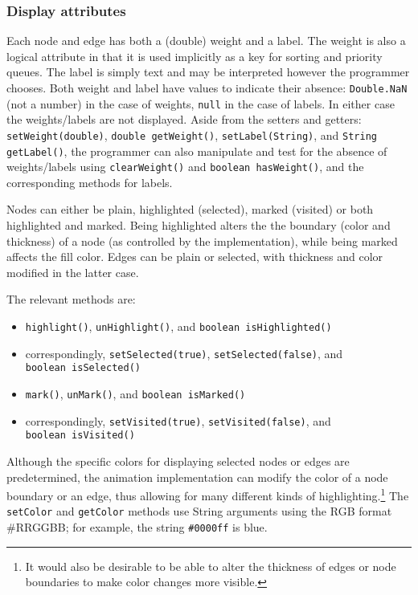 \subsubsection*{Display attributes}

Each node and edge has
both a (double) weight and a label.
The weight
is also a logical
attribute in that
it is used implicitly as a
key for
sorting and priority queues.
The label is simply text and may be interpreted however the programmer
chooses.
Both weight and label have values to indicate their absence:
\texttt{Double.NaN} (not a number) in the case of weights, \texttt{null}
in the case of labels.
In either case the weights/labels are not displayed.
Aside from the setters and getters: \texttt{setWeight(double)},
\mbox{\texttt{double getWeight()}}, \texttt{setLabel(String)},
and \mbox{\texttt{String getLabel()}}, the programmer can also
manipulate and test for the absence of weights/labels using
\texttt{clearWeight()} and \texttt{boolean~hasWeight()},
and the corresponding methods for labels.

Nodes can either be plain, highlighted (selected), marked (visited) or both highlighted and
marked.
Being highlighted alters the
the boundary (color and thickness) of a node (as controlled by the
implementation), while being marked affects the fill color.
Edges can be plain or selected, with thickness and color modified in the
latter case.

The relevant methods are:
\begin{itemize}
\item \texttt{highlight()}, \texttt{unHighlight()}, and \texttt{boolean~isHighlighted()}
\item correspondingly, \texttt{setSelected(true)}, \texttt{setSelected(false)},
and \texttt{boolean~isSelected()}
\item \texttt{mark()}, \texttt{unMark()}, and \texttt{boolean~isMarked()}
\item correspondingly, \texttt{setVisited(true)}, \texttt{setVisited(false)},
and \texttt{boolean~isVisited()}
\end{itemize}

Although the specific colors for displaying selected nodes or edges are
predetermined, the animation implementation can modify the color of a node boundary
or an edge, thus allowing for many different kinds of highlighting.\footnote{
It would also be desirable to be able to alter the thickness of edges or node boundaries to make color changes more visible.
}
The \texttt{setColor} and \texttt{getColor} methods use String arguments
using the RGB format \textsf{\#RRGGBB}; for example,
the string \texttt{\#0000ff} is blue.

